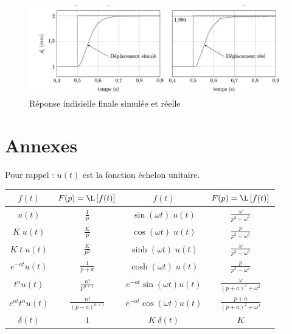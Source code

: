 \begin{figure}[H]
\begin{center}
\includegraphics[width=1.0\textwidth]{images/image_simu.jpg}
\caption{Réponse indisielle finale simulée et réelle \label{fig_simu}}
\end{center}
\end{figure}




\section{Annexes}


Pour rappel : $u(t)$ est la fonction échelon unitaire.
\renewcommand\arraystretch{1.3}
\begin{center}
\begin{tabular}{|c|c||c|c|}
	\hline
	$f(t)$			&	$\displaystyle F(p)=\L\left[f(t)\right]$		&	$f(t)$					&	$F(p)=\L\left[f(t)\right]$					\\[0.3cm]
	\hline\hline
	$u(t)$			&	$\displaystyle \frac 1p$				&	$\sin(\omega t)\;u(t)$		&	$\displaystyle \frac{\omega}{p^2+\omega^2}$	\\[0.3cm]
	\hline
	$K\;u(t)$		&	$\displaystyle \frac{K}{p}$			&	$\cos(\omega t)\;u(t)$		&	$\displaystyle \frac{p}{p^2+\omega^2}$		\\[0.3cm]
	\hline
	$K\;t\;u(t)$		&	$\displaystyle \frac K{p^2}$			&	$\sinh(\omega t)\;u(t)$		&	$\displaystyle \frac \omega{p^2-\omega^2}$		\\[0.3cm]
	\hline
	$e^{-at}u(t)$	&	$\displaystyle \frac{1}{p+a}$			&	$\cosh(\omega t)\;u(t)$		&	$\displaystyle \frac{p}{p^2-\omega^2}$		\\[0.3cm]
	\hline
	$t^nu(t)$		&	$\displaystyle \frac{n!}{p^{n+1}}$		&	$e^{-at}\sin(\omega t)u(t)$	&	$\displaystyle \frac \omega{(p+a)^2+\omega^2}$	\\[0.3cm]
	\hline
	$e^{at} t^n u(t)$	&	$\displaystyle \frac{n!}{(p-a)^{n+1}}$		&	$e^{-at}\cos(\omega t) u(t)$	&	$\displaystyle \frac{p+a}{(p+a)^2+\omega^2}$	\\[0.3cm]
	\hline
	$\delta(t)$		&	$1$							&	$K\;\delta(t)$			&	$K$								\\[0.3cm]
	\hline
\end{tabular}
\end{center}

